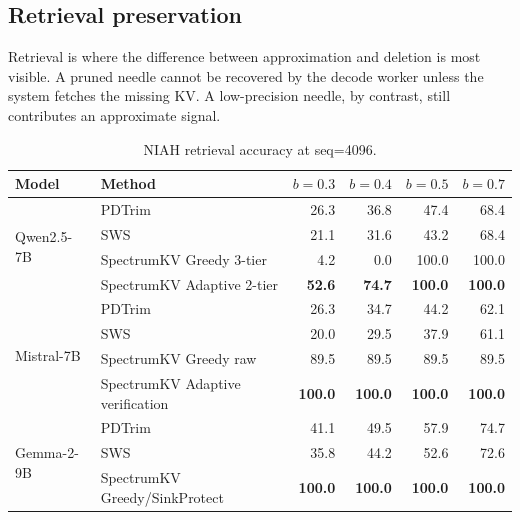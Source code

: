 \documentclass[11pt]{article}
\newcommand{\method}{SpectrumKV}
\newcommand{\budget}{b}
\theoremstyle{plain}
\theoremstyle{definition}
\begin{document}
\subsection{Retrieval preservation}
\label{sec:rq11}

Retrieval is where the difference between approximation and deletion is most visible.  A pruned needle cannot be recovered by the decode worker unless the system fetches the missing KV.  A low-precision needle, by contrast, still contributes an approximate signal.

\begin{table}[t]
\centering
\caption{NIAH retrieval accuracy at seq=4096.}
\label{tab:niah}
\small
\begin{tabular}{llrrrr}
\toprule
Model & Method & $\budget=0.3$ & $\budget=0.4$ & $\budget=0.5$ & $\budget=0.7$ \\
\midrule
\multirow{4}{*}{Qwen2.5-7B}
  & PDTrim & 26.3 & 36.8 & 47.4 & 68.4 \\
  & SWS & 21.1 & 31.6 & 43.2 & 68.4 \\
  & \method{} Greedy 3-tier & 4.2 & 0.0 & 100.0 & 100.0 \\
  & \method{} Adaptive 2-tier & \textbf{52.6} & \textbf{74.7} & \textbf{100.0} & \textbf{100.0} \\
\midrule
\multirow{4}{*}{Mistral-7B}
  & PDTrim & 26.3 & 34.7 & 44.2 & 62.1 \\
  & SWS & 20.0 & 29.5 & 37.9 & 61.1 \\
  & \method{} Greedy raw & 89.5 & 89.5 & 89.5 & 89.5 \\
  & \method{} Adaptive verification & \textbf{100.0} & \textbf{100.0} & \textbf{100.0} & \textbf{100.0} \\
\midrule
\multirow{3}{*}{Gemma-2-9B}
  & PDTrim & 41.1 & 49.5 & 57.9 & 74.7 \\
  & SWS & 35.8 & 44.2 & 52.6 & 72.6 \\
  & \method{} Greedy/SinkProtect & \textbf{100.0} & \textbf{100.0} & \textbf{100.0} & \textbf{100.0} \\
\bottomrule
\end{tabular}
\end{table}
\end{document}
